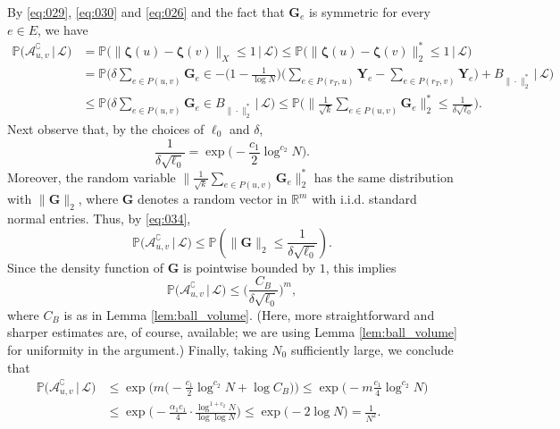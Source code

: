 \documentclass[11pt,leqno]{amsart}
\theoremstyle{remark}
\theoremstyle{plain}
\begin{document}
By \eqref{eq:029}, \eqref{eq:030} and \eqref{eq:026} and the fact that $\mathbf{G}_e$ is symmetric for every $e\in E$, we have
\begin{align} \label{eq:034}
\mathbb{P}\big( \mathcal{A}_{u,v}^{\complement}\, \big|\, \mathcal{L}\big) & =
\mathbb{P}\big( \| \boldsymbol{\zeta}(u) - \boldsymbol{\zeta}(v)\|_X\leqslant 1\, \big|\,\mathcal{L}\big) \leqslant
\mathbb{P}\big( \| \boldsymbol{\zeta}(u) - \boldsymbol{\zeta}(v)\|_2^*\leqslant 1\, \big|\, \mathcal{L}\big) \\
& = \mathbb{P} \Big( \delta\sum_{e\in P(u,v)} \mathbf{G}_e \in -\Big(1-\frac{1}{\log N}\Big) \Big(\sum_{e\in P(r_T,u)} \mathbf{Y}_e - \sum_{e\in P(r_T,v)} \mathbf{Y}_e\Big)
+ B_{\|\cdot\|_2^*} \, \Big|\, \mathcal{L}\Big) \nonumber \\
& \leqslant \mathbb{P} \Big( \delta\sum_{e\in P(u,v)} \mathbf{G}_e \in  B_{\|\cdot\|_2^*}\, \Big|\,  \mathcal{L}\Big)
\leqslant \mathbb{P}\Bigg(\Big\|\frac{1}{\sqrt{k}}\sum_{e\in P(u,v)} \mathbf{G}_e\Big\|_2^*
\leqslant\frac{1}{\delta\sqrt{\ell_0}}\Bigg). \nonumber
\end{align}
Next observe that, by the choices of $\ell_0$ and $\delta$,
\begin{equation} \label{eq:035}
\frac{1}{\delta\sqrt{\ell_0}} = \exp\Big(-\frac{c_1}{2} \log^{c_2}N\Big).
\end{equation}
Moreover, the random variable $\big\|\frac{1}{\sqrt{k}}\sum_{e\in P(u,v)} \mathbf{G}_e\big\|_2^*$
has the same distribution with $\|\mathbf{G}\|_2$, where $\mathbf{G}$ denotes a random vector in $\mathbb{R}^m$
with i.i.d. standard normal entries. Thus, by \eqref{eq:034},
\begin{equation}\label{eq:036}
\mathbb{P}\big(\mathcal{A}_{u,v}^{\complement}\, \big|\, \mathcal{L}\big) \leqslant
\mathbb{P}\left( \|\mathbf{G}\|_2 \leqslant\frac{1}{\delta\sqrt{\ell_0}}\right).
\end{equation}
Since the density function
of $\mathbf{G}$ is pointwise bounded by $1$, this implies
\begin{equation} \label{eq:037}
\mathbb{P}\big( \mathcal{A}_{u,v}^{\complement}\,\big|\,\mathcal{L}\big)
\leqslant \Big(\frac{C_B}{\delta\sqrt{\ell_0}}\Big)^m,
\end{equation}
where $C_B$ is as in Lemma \ref{lem:ball_volume}. (Here, more straightforward and sharper estimates are, of course, available; we are using Lemma \ref{lem:ball_volume} for uniformity in the argument.) Finally, taking $N_0$ sufficiently large, we conclude that
\begin{align*}
\mathbb{P}\big( \mathcal{A}_{u,v}^{\complement}\,\big|\,\mathcal{L}\big)
& \leqslant \exp\Big( m\Big(-\frac{c_1}{2}\log^{c_2}N + \log C_B\Big)\Big)
\leqslant \exp\Big( -m\frac{c_1}{4}\log^{c_2}N \Big) \\
& \leqslant \exp\Big(-\frac{\alpha_1 c_1}{4}\cdot \frac{\log^{1+c_2}N}{\log\log N} \Big)
\leqslant \exp\big(-2\log N\big) = \frac{1}{N^2}.
\end{align*}
\end{document}
